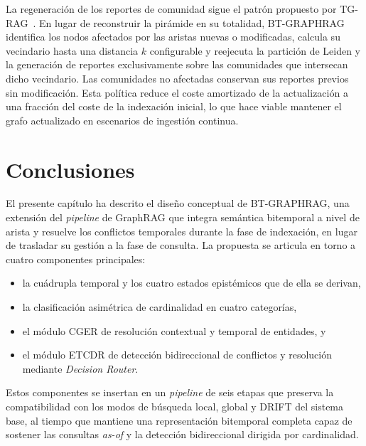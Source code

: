 La regeneración de los reportes de comunidad sigue el patrón propuesto por TG-RAG~\cite{tg_rag2025}. En lugar de reconstruir la pirámide en su totalidad, BT-GRAPHRAG identifica los nodos afectados por las aristas nuevas o modificadas, calcula su vecindario hasta una distancia $k$ configurable y reejecuta la partición de Leiden y la generación de reportes exclusivamente sobre las comunidades que intersecan dicho vecindario. Las comunidades no afectadas conservan sus reportes previos sin modificación. Esta política reduce el coste amortizado de la actualización a una fracción del coste de la indexación inicial, lo que hace viable mantener el grafo actualizado en escenarios de ingestión continua.

\section{Conclusiones}\label{sec:bt-conclusions}

El presente capítulo ha descrito el diseño conceptual de BT-GRAPHRAG, una extensión del \emph{pipeline} de GraphRAG que integra semántica bitemporal a nivel de arista y resuelve los conflictos temporales durante la fase de indexación, en lugar de trasladar su gestión a la fase de consulta. La propuesta se articula en torno a cuatro componentes principales:

\begin{itemize}
    \item la cuádrupla temporal y los cuatro estados epistémicos que de ella se derivan,
    \item la clasificación asimétrica de cardinalidad en cuatro categorías,
    \item el módulo CGER de resolución contextual y temporal de entidades, y
    \item el módulo ETCDR de detección bidireccional de conflictos y resolución mediante \emph{Decision Router}.
\end{itemize}

Estos componentes se insertan en un \emph{pipeline} de seis etapas que preserva la compatibilidad con los modos de búsqueda local, global y DRIFT del sistema base, al tiempo que mantiene una representación bitemporal completa capaz de sostener las consultas \emph{as-of} y la detección bidireccional dirigida por cardinalidad.

